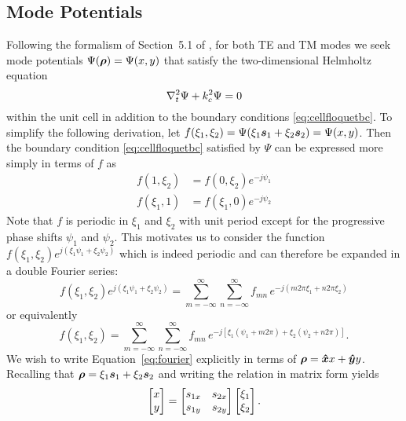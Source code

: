 \subsection{Mode Potentials}

Following the formalism of Section~5.1 of \cite{coll:91}, for both TE
and TM modes we seek mode potentials $\Psi(\boldsymbol{\rho}) = \Psi(x,y)$ that satisfy the
two-dimensional Helmholtz equation
\begin{equation}
  \label{eq:laplace2d}
  \nabla^2_t \Psi + k_c^2 \Psi = 0
\end{equation}
within the unit cell in addition to the boundary 
conditions \eqref{eq:cellfloquetbc}.
To simplify the following derivation, let $f(\xi_1,\xi_2) =
\Psi(\xi_1\boldsymbol{s}_1 + \xi_2\boldsymbol{s}_2) = \Psi(x,y)$.
Then the boundary condition \eqref{eq:cellfloquetbc} satisfied by $\Psi$
can be expressed more simply in terms of $f$ as
\begin{subequations}
  \label{eq:cellfloquetbcf}
  \begin{align}
    f(1, \xi_2) &= f(0,\xi_2) e^{-j\psi_1} \\
    f(\xi_1, 1) &= f(\xi_1, 0) e^{-j\psi_2} 
  \end{align}
\end{subequations}
Note that $f$ is periodic in $\xi_1$ and $\xi_2$ with unit period 
except for the
progressive phase shifts $\psi_1$ and $\psi_2$.  This motivates us to
consider the function $f(\xi_1,\xi_2) e^{j(\xi_1\psi_1 +
  \xi_2\psi_2)}$ which is indeed periodic and can therefore be
expanded in a double Fourier series:
\begin{equation*}
  f(\xi_1,\xi_2) e^{j(\xi_1\psi_1 + \xi_2\psi_2)} = 
  \sum_{m=-\infty}^{\infty} \sum_{n=-\infty}^{\infty} \!\!\!
  f_{mn} \, e^{-j(m2\pi\xi_1 + n2\pi\xi_2)}
\end{equation*}
or equivalently
\begin{equation}
  \label{eq:fourier}
  f(\xi_1,\xi_2) =
  \sum_{m=-\infty}^{\infty} \sum_{n=-\infty}^{\infty} \!\!\!
  f_{mn} \, e^{-j[\xi_1(\psi_1+m2\pi) + \xi_2(\psi_2+n2\pi)]}.
\end{equation}
We wish to write Equation~\eqref{eq:fourier} explicitly in terms of
$\boldsymbol{\rho} = \boldsymbol{\hat{x}} x + \boldsymbol{\hat{y}} y$.  Recalling that $\boldsymbol{\rho} = \xi_1\boldsymbol{s}_1 +
\xi_2\boldsymbol{s}_2$ and writing the relation in matrix form yields
\begin{equation}
  \begin{bmatrix} x\\y \end{bmatrix} = 
  \begin{bmatrix}
    s_{1x} & s_{2x} \\
    s_{1y} & s_{2y} 
  \end{bmatrix}
    \begin{bmatrix} \xi_1 \\ \xi_2 \end{bmatrix}.
\end{equation}
